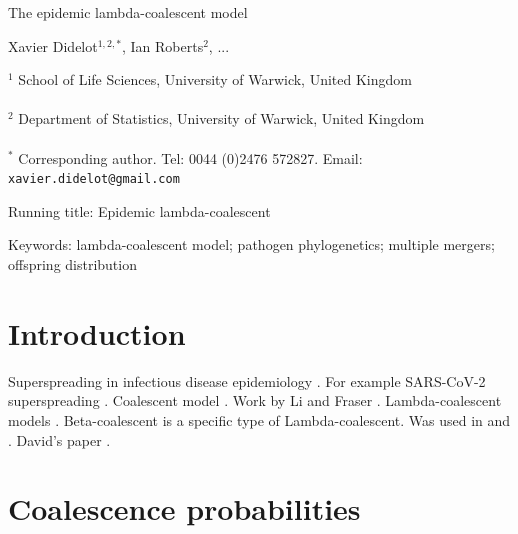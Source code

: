 \documentclass{article}
\begin{document}
{\Large The epidemic lambda-coalescent model}


\vspace*{2cm}
Xavier Didelot$^{1,2,*}$, Ian Roberts$^{2}$, ...

\vspace*{2cm}
$^1$ School of Life Sciences, University of Warwick, United Kingdom\\\\
$^2$ Department of Statistics, University of Warwick, United Kingdom\\\\
$^*$ Corresponding author. Tel: 0044 (0)2476 572827. Email: \verb+xavier.didelot@gmail.com+

\vspace*{2cm}
Running title: Epidemic lambda-coalescent

\vspace*{2cm}
Keywords: lambda-coalescent model; pathogen phylogenetics; multiple mergers; offspring distribution


\newpage
\section{Introduction}

Superspreading in infectious disease epidemiology \citep{Lloyd-Smith2005}.
For example SARS-CoV-2 superspreading \citep{Wang2020,lemieuxPhylogeneticAnalysisSARSCoV22021,gomez-carballaSuperspreadingEmergenceCOVID192021}.
Coalescent model \citep{Kingman1982,Kingman1982a}.
Work by Li and Fraser \citep{Li2017,Fraser2017}.
Lambda-coalescent models \citep{pitmanCoalescentsMultipleCollisions1999,sagitovGeneralCoalescentAsynchronous1999,donnellyParticleRepresentationsMeasureValued1999}. 
Beta-coalescent \citep{schweinsbergCoalescentProcessesObtained2003} is a specific type of Lambda-coalescent. 
Was used in \citep{Hoscheit2019} and \citep{Menardo2021}. 
David's paper \citep{Helekal2024}.

\section{Coalescence probabilities}
\end{document}
